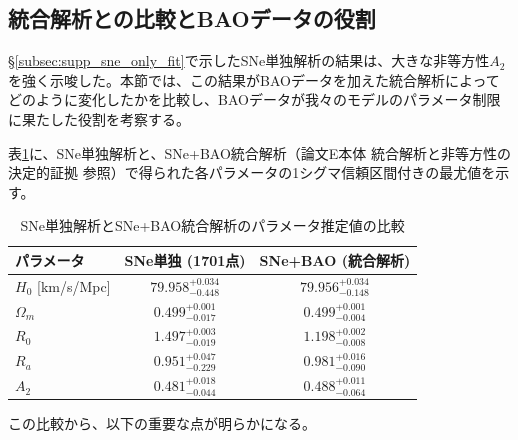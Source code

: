 \documentclass[a4paper,12pt]{article}
\begin{document}
\subsection{統合解析との比較とBAOデータの役割}
\label{subsec:supp_joint_comparison}

§\ref{subsec:supp_sne_only_fit}で示したSNe単独解析の結果は、大きな非等方性$A_2$を強く示唆した。本節では、この結果がBAOデータを加えた統合解析によってどのように変化したかを比較し、BAOデータが我々のモデルのパラメータ制限に果たした役割を考察する。

表\ref{tab:supp_param_comparison}に、SNe単独解析と、SNe+BAO統合解析（論文E本体 統合解析と非等方性の決定的証拠 参照）で得られた各パラメータの1シグマ信頼区間付きの最尤値を示す。

\begin{table}[H]
    \centering
    \caption{SNe単独解析とSNe+BAO統合解析のパラメータ推定値の比較}
    \label{tab:supp_param_comparison}
    \begin{tabular}{@{}lcc@{}}
        \toprule
        \textbf{パラメータ} & \textbf{SNe単独 (1701点)} & \textbf{SNe+BAO (統合解析)} \\
        \midrule
        $H_0$ [km/s/Mpc] & $79.958 ^{+0.034} _{-0.448}$ & $79.956 ^{+0.034} _{-0.148}$ \\
        $\Omega_m$ & $0.499 ^{+0.001} _{-0.017}$ & $0.499 ^{+0.001} _{-0.004}$ \\
        $R_0$ & $1.497 ^{+0.003} _{-0.019}$ & $1.198 ^{+0.002} _{-0.008}$ \\
        $R_a$ & $0.951 ^{+0.047} _{-0.229}$ & $0.981 ^{+0.016} _{-0.090}$ \\
        $A_2$ & $0.481 ^{+0.018} _{-0.044}$ & $0.488 ^{+0.011} _{-0.064}$ \\
        \bottomrule
    \end{tabular}
\end{table}

この比較から、以下の重要な点が明らかになる。
\end{document}
